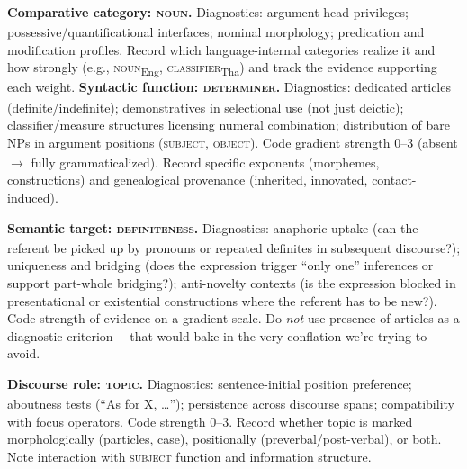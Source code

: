 \documentclass[12pt]{article}
\begin{document}
\begin{exe}
\ex \textbf{Comparative category: \textsc{noun}\textsubscript{\Cross}.} Diagnostics: argument-head privileges; possessive/quantificational interfaces; nominal morphology; predication and modification profiles. Record which language-internal categories realize it and how strongly (e.g., \textsc{noun}\textsubscript{Eng}, \textsc{classifier}\textsubscript{Tha}) and track the evidence supporting each weight.
\ex \textbf{Syntactic function: \textsc{determiner}\textsubscript{\Cross}.} Diagnostics: dedicated articles (definite/indefinite); demonstratives in selectional use (not just deictic); classifier/measure structures licensing numeral combination; distribution of bare NPs in argument positions (\textsc{subject}\textsubscript{\Cross}, \textsc{object}\textsubscript{\Cross}). Code gradient strength 0--3 (absent $\to$ fully grammaticalized). Record specific exponents (morphemes, constructions) and genealogical provenance (inherited, innovated, contact-induced).

\ex \textbf{Semantic target: \textsc{definiteness}\textsubscript{\Cross}.} Diagnostics: anaphoric uptake (can the referent be picked up by pronouns or repeated definites in subsequent discourse?); uniqueness and bridging (does the expression trigger \enquote{only one} inferences or support part-whole bridging?); anti-novelty contexts (is the expression blocked in presentational or existential constructions where the referent has to be new?). Code strength of evidence on a gradient scale. Do \emph{not} use presence of articles as a diagnostic criterion~-- that would bake in the very conflation we're trying to avoid.

\ex \textbf{Discourse role: \textsc{topic}\textsubscript{\Cross}.} Diagnostics: sentence-initial position preference; aboutness tests (\enquote{As for X, \dots}); persistence across discourse spans; compatibility with focus operators. Code strength 0--3. Record whether topic is marked morphologically (particles, case), positionally (preverbal/post-verbal), or both. Note interaction with \textsc{subject}\textsubscript{\Cross} function and information structure.
\end{exe}
\end{document}
